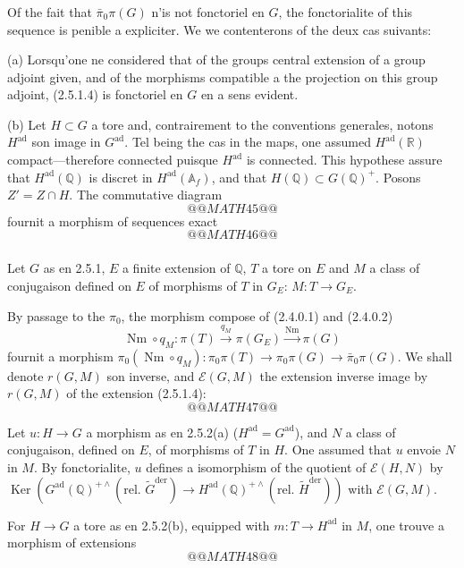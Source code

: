 \documentclass[12pt,a4paper]{article}
\theoremstyle{plain}
\theoremstyle{definition}
\theoremstyle{remark}
\DeclareMathOperator{\Ker}{Ker}
\DeclareMathOperator{\Nm}{Nm}
\newcommand{\QQ}{\mathbb{Q}}
\newcommand{\RR}{\mathbb{R}}
\newcommand{\Af}{\mathbb{A}_f}
\begin{document}
\subsubsection{}

Of the fait that $\bar{\pi}_0\pi(G)$ n'is not fonctoriel en $G$, the fonctorialite of this sequence is penible a expliciter. We we contenterons of the deux cas suivants:

(a) Lorsqu'one ne considered that of the groups central extension of a group adjoint given, and of the morphisms compatible a the projection on this group adjoint, (2.5.1.4) is fonctoriel en $G$ en a sens evident.

(b) Let $H \subset G$ a tore and, contrairement to the conventions generales, notons $H^{\text{ad}}$ son image in $G^{\text{ad}}$. Tel being the cas in the maps, one assumed $H^{\text{ad}}(\RR)$ compact---therefore connected puisque $H^{\text{ad}}$ is connected. This hypothese assure that $H^{\text{ad}}(\QQ)$ is discret in $H^{\text{ad}}(\Af)$, and that $H(\QQ) \subset G(\QQ)^+$. Posons $Z' = Z \cap H$. The commutative diagram
\[
@@MATH45@@
\]
fournit a morphism of sequences exact
\[
@@MATH46@@
\]

\subsubsection{}

Let $G$ as en 2.5.1, $E$ a finite extension of $\QQ$, $T$ a tore on $E$ and $M$ a class of conjugaison defined on $E$ of morphisms of $T$ in $G_E$: $M: T \to G_E$.

By passage to the $\pi_0$, the morphism compose of (2.4.0.1) and (2.4.0.2)
\[
\Nm \circ q_M: \pi(T) \xrightarrow{q_M} \pi(G_E) \xrightarrow{\Nm} \pi(G)
\]
fournit a morphism $\pi_0(\Nm \circ q_M): \pi_0\pi(T) \to \pi_0\pi(G) \to \bar{\pi}_0\pi(G)$. We shall denote $r(G,M)$ son inverse, and $\mathscr{E}(G,M)$ the extension inverse image by $r(G,M)$ of the extension (2.5.1.4):
\[
@@MATH47@@
\]

Let $u: H \to G$ a morphism as en 2.5.2(a) ($H^{\text{ad}} = G^{\text{ad}}$), and $N$ a class of conjugaison, defined on $E$, of morphisms of $T$ in $H$. One assumed that $u$ envoie $N$ in $M$. By fonctorialite, $u$ defines a isomorphism of the quotient of $\mathscr{E}(H,N)$ by $\Ker(G^{\text{ad}}(\QQ)^{+\wedge}(\text{rel.~}\tilde{G}^{\text{der}}) \to H^{\text{ad}}(\QQ)^{+\wedge}(\text{rel.~}\tilde{H}^{\text{der}}))$ with $\mathscr{E}(G,M)$.

For $H \to G$ a tore as en 2.5.2(b), equipped with $m: T \to H^{\text{ad}}$ in $M$, one trouve a morphism of extensions
\[
@@MATH48@@
\]
\end{document}
